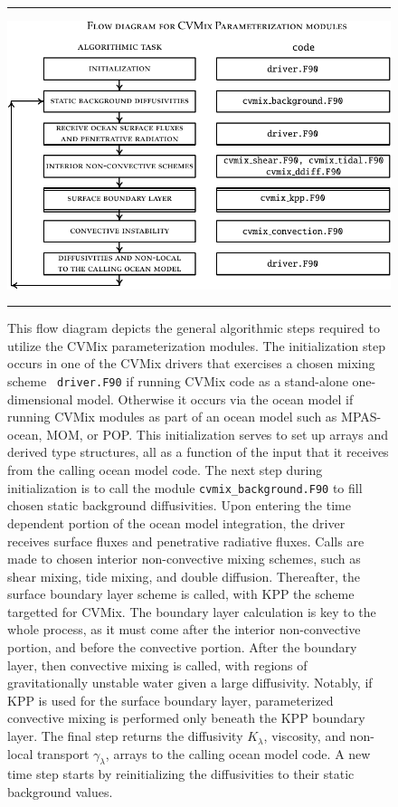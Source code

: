 \begin{figure}[h!t]
\rule{\textwidth}{0.005in}
\begin{center}
\includegraphics[angle=0,width=15cm]{./mfpic_figs/cvmix_flow_diagram.pdf}
\caption[Flow diagram for CVMix schemes]{\sf This flow diagram depicts
  the general algorithmic steps required to utilize the CVMix
  parameterization modules.  The initialization step occurs in one of
  the CVMix drivers that exercises a chosen mixing scheme {\tt
    driver.F90} if running CVMix code as a stand-alone one-dimensional
  model.  Otherwise it occurs via the ocean model if running CVMix
  modules as part of an ocean model such as MPAS-ocean, MOM, or POP.
  This initialization serves to set up arrays and derived type
  structures, all as a function of the input that it receives from the
  calling ocean model code.  The next step during initialization is to
  call the module {\tt cvmix\_background.F90} to fill chosen static
  background diffusivities.  Upon entering the time dependent portion
  of the ocean model integration, the driver receives surface fluxes
  and penetrative radiative fluxes.  Calls are made to chosen interior
  non-convective mixing schemes, such as shear mixing, tide mixing,
  and double diffusion.  Thereafter, the surface boundary layer scheme
  is called, with KPP the scheme targetted for CVMix.  The boundary
  layer calculation is key to the whole process, as it must come after
  the interior non-convective portion, and before the convective
  portion.  After the boundary layer, then convective mixing is
  called, with regions of gravitationally unstable water given a large
  diffusivity.  Notably, if KPP is used for the surface boundary
  layer, parameterized convective mixing is performed only beneath the
  KPP boundary layer.  The final step returns the diffusivity
  $K_{\lambda}$, viscosity, and non-local transport
  $\gamma_{\lambda}$, arrays to the calling ocean model code.  A new
  time step starts by reinitializing the diffusivities to their static
  background values.}
\label{fig:vertical_mix_flow_cvmix}
\end{center}
\rule{\textwidth}{0.005in}
\end{figure}




